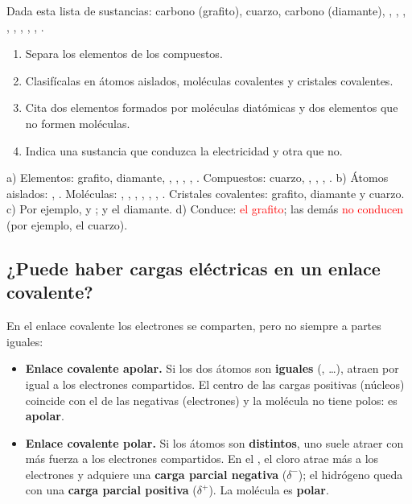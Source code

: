 \begin{exercise}
    Dada esta lista de sustancias: carbono (grafito), cuarzo, carbono (diamante), , , , , , , , , .
    \begin{enumerate}[label=\alph*)]
        \item Separa los elementos de los compuestos.
        \item Clasifícalas en átomos aislados, moléculas covalentes y cristales covalentes.
        \item Cita dos elementos formados por moléculas diatómicas y dos elementos que no formen moléculas.
        \item Indica una sustancia que conduzca la electricidad y otra que no.
    \end{enumerate}
    \begin{solu}
        a) Elementos: grafito, diamante, , , , , . Compuestos: cuarzo, , , , .
        b) Átomos aislados: , . Moléculas: , , , , , , . Cristales covalentes: grafito, diamante y cuarzo.
        c) Por ejemplo,  y ;  y el diamante.
        d) Conduce: \textcolor{red}{el grafito}; las demás \textcolor{red}{no conducen} (por ejemplo, el cuarzo).
    \end{solu}
\end{exercise}

\subsection{¿Puede haber cargas eléctricas en un enlace covalente?}

En el enlace covalente los electrones se comparten, pero no siempre a partes iguales:

\begin{itemize}
    \item \textbf{Enlace covalente apolar.} Si los dos átomos son \textbf{iguales} (, \ldots), atraen por igual a los electrones compartidos. El centro de las cargas positivas (núcleos) coincide con el de las negativas (electrones) y la molécula no tiene polos: es \textbf{apolar}.
    \item \textbf{Enlace covalente polar.} Si los átomos son \textbf{distintos}, uno suele atraer con más fuerza a los electrones compartidos. En el , el cloro atrae más a los electrones y adquiere una \textbf{carga parcial negativa} (\(\delta^-\)); el hidrógeno queda con una \textbf{carga parcial positiva} (\(\delta^+\)). La molécula es \textbf{polar}.
\end{itemize}

